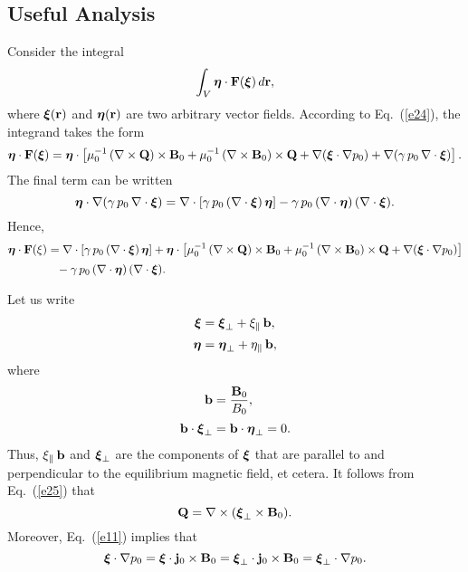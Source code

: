 \documentclass[12pt,prb,aps,notitlepage]{revtex4-1}
\newcommand{\bxi}{\mbox{\boldmath$\xi$}}
\newcommand{\bta}{\mbox{\boldmath$\eta$}}
\begin{document}
\subsection{Useful Analysis}
Consider the integral
 \begin{equation}\label{intg}
\int_V \bta\cdot{\bf F}(\bxi)\,d{\bf r},
\end{equation}
where $\bxi({\bf r})$ and $\bta({\bf r})$ are two arbitrary vector fields. 
According to Eq.~(\ref{e24}), the integrand  takes the form 
\begin{equation}
\bta\cdot {\bf F}(\bxi)= \bta\cdot\left[ \mu_0^{-1}\,(\nabla\times {\bf Q})\times{\bf B}_0+ \mu_0^{-1}\, (\nabla\times {\bf B}_0)\times {\bf Q}
+\nabla(\bxi\cdot\nabla p_0) + \nabla(\gamma\,p_0\,\nabla\cdot\bxi)\right].
\end{equation}
The final term can be written
\begin{equation}
\bta\cdot \nabla(\gamma\,p_0\,\nabla\cdot\bxi)= \nabla\cdot [\gamma\,p_0\,(\nabla\cdot\bxi)\,\bta]-\gamma\,p_0\,(\nabla\cdot\bta)\,(\nabla\cdot\bxi).
\end{equation}
 Hence,
\begin{align}
\bta\cdot {\bf F}(\xi)&= \nabla\cdot [\gamma\,p_0\,(\nabla\cdot\bxi)\,\bta]+\bta\cdot\left[ \mu_0^{-1}\,(\nabla\times {\bf Q})\times{\bf B}_0+ \mu_0^{-1}\, (\nabla\times {\bf B}_0)\times {\bf Q}
+\nabla(\bxi\cdot\nabla p_0)\right]\nonumber\\[0.5ex]
&\phantom{=} -\gamma\,p_0\,(\nabla\cdot\bta)\,(\nabla\cdot\bxi).\label{e31}
\end{align}

Let us write
\begin{align}\label{e32}
\bxi &=\bxi_\perp + \xi_\parallel\,{\bf b},\\[0.5ex]
\bta&=\bta_\perp+\eta_\parallel\,{\bf b},\label{e33x}
\end{align}
where 
\begin{align}
{\bf b} &=\frac{{\bf B}_0}{B_0},\\[0.5ex]
{\bf b} \cdot\bxi_\perp &= {\bf b}\cdot\bta_\perp = 0.
\end{align}
Thus, $\xi_\parallel\,{\bf b}$ and $\bxi_\perp$ are the components of $\bxi$ that are parallel to and perpendicular to the equilibrium magnetic field, et cetera.
It follows from Eq.~(\ref{e25}) that
\begin{equation}\label{e36}
{\bf Q} = \nabla\times (\bxi_\perp\times {\bf B}_0).
\end{equation}
Moreover, Eq.~(\ref{e11}) implies that
\begin{equation}\label{e37}
\bxi\cdot\nabla p_0 = \bxi\cdot{\bf j}_0\times {\bf B}_0= \bxi_\perp\cdot{\bf j}_0\times {\bf B}_0= \bxi_\perp\cdot\nabla p_0.
\end{equation}
\end{document}
